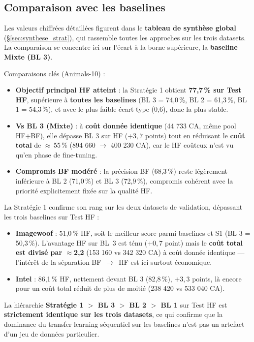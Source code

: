 \documentclass[11pt,a4paper,openany]{book}
\begin{document}
\subsection{Comparaison avec les baselines}

Les valeurs chiffrées détaillées figurent dans le \textbf{tableau de synthèse global} (§\ref{sec:synthese_strat}), qui rassemble toutes les approches sur les trois datasets. La comparaison se concentre ici sur l'écart à la borne supérieure, la \textbf{baseline Mixte (BL 3)}.

\vspace{0.4em}
Comparaisons clés (Animals-10) :

\begin{itemize}
  \item \textbf{Objectif principal HF atteint} : la Stratégie 1 obtient \textbf{77,7\,\% sur Test HF}, supérieure à \textbf{toutes les baselines} (BL 3 = 74,0\,\%, BL 2 = 61,3\,\%, BL 1 = 54,3\,\%), et avec le plus faible écart-type (0,6), donc la plus stable.
  \item \textbf{Vs BL 3 (Mixte)} : à \textbf{coût donnée identique} (44 733 CA, même pool HF+BF), elle dépasse BL 3 sur HF ($+3,7$ points) tout en réduisant le \textbf{coût total} de $\approx$\,55\,\% (894 660 $\rightarrow$ 400 230 CA), car le HF coûteux n'est vu qu'en phase de fine-tuning.
  \item \textbf{Compromis BF modéré} : la précision BF (68,3\,\%) reste légèrement inférieure à BL 2 (71,0\,\%) et BL 3 (72,9\,\%), compromis cohérent avec la priorité explicitement fixée sur la qualité HF.
\end{itemize}

\begin{hypothesebox}
  La Stratégie 1 confirme son rang sur les deux datasets de validation, dépassant les trois baselines sur Test HF :
  \begin{itemize}
    \item \textbf{Imagewoof} : 51,0\,\% HF, soit le meilleur score parmi baselines et S1 (BL 3 = 50,3\,\%). L'avantage HF sur BL~3 est ténu ($+0,7$ point) mais le \textbf{coût total est divisé par $\approx$2,2} (153 160 vs 342 320 CA) à coût donnée identique — l'intérêt de la séparation BF~$\rightarrow$~HF est ici surtout économique.
    \item \textbf{Intel} : 86,1\,\% HF, nettement devant BL 3 (82,8\,\%), $+3,3$ points, là encore pour un coût total réduit de plus de moitié (238 420 vs 533 040 CA).
  \end{itemize}
  La hiérarchie \textbf{Stratégie 1 $>$ BL 3 $>$ BL 2 $>$ BL 1} sur Test HF est \textbf{strictement identique sur les trois datasets}, ce qui confirme que la dominance du transfer learning séquentiel sur les baselines n'est pas un artefact d'un jeu de données particulier.
\end{hypothesebox}
\end{document}
